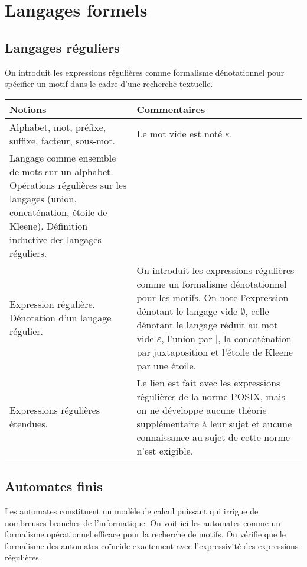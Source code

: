 \section{Langages formels \semTroisQuatre}

\subsection{Langages réguliers}

On introduit les expressions régulières comme formalisme dénotationnel pour spécifier un motif dans le cadre d'une recherche textuelle.

\noindent
\begin{longtable}{|p{\lnotion}|p{\comment}|}
    \hline
    \textbf{Notions} & \textbf{Commentaires} \\
    \hline \hline
    Alphabet, mot, préfixe, suffixe, facteur, sous-mot.
    &
    Le mot vide est noté $\varepsilon$.
    \\ \hline
    Langage comme ensemble de mots sur un alphabet. Opérations régulières sur les langages (union, concaténation, étoile de Kleene). Définition inductive des langages réguliers. & \\
    \hline
    Expression régulière. Dénotation d'un langage régulier.
    &
    On introduit les expressions régulières comme un formalisme dénotationnel pour les motifs. On note l'expression dénotant le langage vide $\emptyset$, celle dénotant le langage réduit au mot vide $\varepsilon$, l'union par $|$, la concaténation par juxtaposition et l'étoile de Kleene par une étoile.
    \\ \hline 
    Expressions régulières étendues. & Le lien est fait avec les expressions régulières de la norme POSIX, mais on ne développe aucune théorie supplémentaire à leur sujet et aucune connaissance au sujet de cette norme n'est exigible.
    \\
    \hline
\end{longtable}


\subsection{Automates finis}

Les automates constituent un modèle de calcul puissant qui irrigue de nombreuses branches de l'informatique. On voit ici les automates comme un formalisme opérationnel efficace pour la recherche de motifs. On vérifie que le formalisme des automates coïncide exactement avec l'expressivité des expressions régulières.


